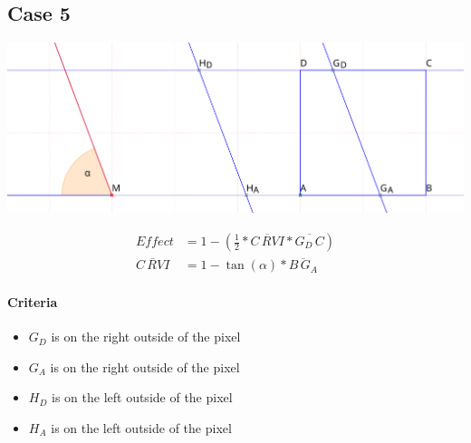\documentclass[a4paper,10pt,fleqn]{scrartcl}
\numberwithin{equation}{subsection}
\begin{document}
\subsection{Case 5}
\begin{minipage}{\textwidth}
\includegraphics[width=\textwidth]{case5}
\end{minipage}
\begin{align}
Effect &= 1 - (\frac{1}{2} * \overline{C\,RVI} * \overline{G_D\,C})\\
\overline{C\,RVI} &=  1 - \tan(\alpha) * \overline{B\,G_A}
\end{align}
\paragraph{Criteria}
\begin{itemize}
 \item $G_D$ is on the right outside of the pixel
 \item $G_A$ is on the right outside of the pixel
 \item $H_D$ is on the left outside of the pixel
 \item $H_A$ is on the left outside of the pixel
\end{itemize}
\end{document}
